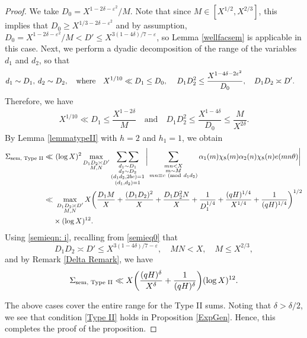 \documentclass[12pt]{amsart}
\numberwithin{equation}{section}
\theoremstyle{remark}
\theoremstyle{definition}
\newcommand{\imod}[1]{\ (\mathrm{mod}\ #1)}
\begin{document}
\begin{proof}
We take $D_0=X^{1-2\delta-\varepsilon^2}/M$. Note that since $M\in [X^{1/2}, X^{2/3}]$, this implies that $D_0\geq X^{1/3-2\delta-\varepsilon^2}$ and by assumption, $D_0=X^{1-2\delta-\varepsilon^2}/M < D'\leq X^{3(1-4\delta)/7 -\varepsilon}$, so Lemma \ref{wellfacsem} is applicable in this case. Next, we perform a dyadic decomposition of the range of the variables $d_1$ and $d_2$, so that
\begin{align}
\notag &d_1\sim D_1,\: d_2\sim D_2, \quad \text{where}\quad X^{1/10} \ll D_1\leq D_0, \: \quad D_1D_2^2 \leq \dfrac{X^{1-4\delta-2\varepsilon^2}}{D_0}, \quad D_1D_2\asymp D'.
 \end{align}
Therefore, we have 
\begin{align}\label{semieqn: i}
X^{1/10} \ll D_1 \leq \dfrac{X^{1-2\delta}}{M} \quad \text{and} \quad D_1D_2^2\leq \dfrac{X^{1-4\delta}}{D_0} \leq \dfrac{M}{X^{2\delta}}.
\end{align}
By Lemma \ref{lemmatypeII} with $h=2$ and $h_1=1$, we obtain
\begin{align}
\notag \Sigma_{\textup{sem, Type II}} \ll &~(\log X)^2 \max_{\substack{D_1D_2\asymp D'\\ M, N}}\mathop{\sum\sum}_{\substack{d_1\sim D_1\\d_2\sim D_2\\(d_1d_2, 2bc)=1\\(d_1,d_2)=1}}\bigg\lvert\sum_{\substack{mn <X\\ m \sim M\\ mn \equiv c \imod {d_1d_2}}}{\alpha}_1(m)\chi_8(m){\alpha}_2(n)\chi_8(n)e(mn\theta)\bigg\rvert\\
\notag \ll &~ \max_{\substack{D_1D_2\asymp D'\\ M, N}}X\bigg(\dfrac{D_1M}{X} + \dfrac{(D_1D_2)^2}{X} + \dfrac{D_1D_2^2N}{X} + \dfrac{1}{D_1^{1/4}}+ \dfrac{(qH)^{1/4}}{X^{1/4}} + \dfrac{1}{(qH)^{1/4}}\bigg)^{1/2}\\
\notag &\times (\log X)^{12}.
\end{align}
Using \eqref{semieqn: i}, recalling from \eqref{semieq0} that 
\[D_1D_2 \asymp D'\leq X^{3(1-4\delta)/7-\varepsilon}, \quad MN <X, \quad M\leq X^{2/3},\] and by Remark \ref{Delta Remark}, we have
\begin{align}
\notag \Sigma_{\textup{sem, Type II}}\ll  X\bigg(\dfrac{(qH)^{\delta}}{X^\delta} + \dfrac{1}{(qH)^{\delta}}\bigg)(\log X)^{12}.
\end{align}


The above cases cover the entire range for the Type II sums. Noting that $\delta>\delta/2$, we see that condition \ref{Type II} holds in Proposition \ref{ExpGen}. Hence, this completes the proof of the proposition.
\end{proof}
\end{document}
